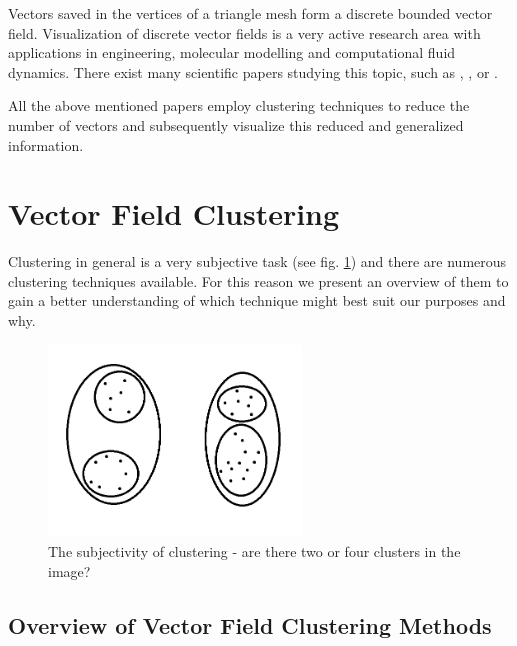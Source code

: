 Vectors saved in the vertices of a triangle mesh form a discrete bounded vector field. Visualization of discrete vector fields is a very active research area with applications in engineering, molecular modelling and computational fluid dynamics. There exist many scientific papers studying this topic, such as \citet{Telea99}, \citet{Garcke00}, \citet{Du04} or \citet{Peng12}.

All the above mentioned papers employ clustering techniques to reduce the number of vectors and subsequently visualize this reduced and generalized information.

\section{Vector Field Clustering}

Clustering in general is a very subjective task (see fig. \ref{fig:clustering_subjectivity}) and there are numerous clustering techniques available. For this reason we present an overview of them to gain a better understanding of which technique might best suit our purposes and why.

\begin{figure}[h]
\centering
\includegraphics[width=0.6\textwidth]{./img/clustering_subjectivity.png}
\caption{The subjectivity of clustering - are there two or four clusters in the image?}
\label{fig:clustering_subjectivity}
\end{figure}

\subsection{Overview of Vector Field Clustering Methods}

